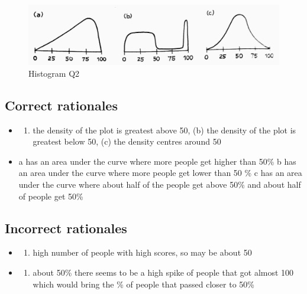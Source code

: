 \documentclass[letterpaper,10pt,twoside,printwatermark=false]{pinp}
\providecommand{\tightlist}{%
  \setlength{\itemsep}{0pt}\setlength{\parskip}{0pt}}
\begin{document}
\begin{figure}[H]
  \begin{center}
    \includegraphics[scale=0.19]{hist_q2.jpg} 
  \end{center}
  \caption{Histogram Q2}\label{fig}
\end{figure}

\subsection{Correct rationales}\label{correct-rationales-3}

\begin{itemize}
\item
  \begin{enumerate}
  \def\labelenumi{(\alph{enumi})}
  \tightlist
  \item
    the density of the plot is greatest above 50, (b) the density of the
    plot is greatest below 50, (c) the density centres around 50
  \end{enumerate}
\item
  a has an area under the curve where more people get higher than 50\% b
  has an area under the curve where more people get lower than 50 \% c
  has an area under the curve where about half of the people get above
  50\% and about half of people get 50\%
\end{itemize}

\subsection{Incorrect rationales}\label{incorrect-rationales-3}

\begin{itemize}
\item
  \begin{enumerate}
  \def\labelenumi{(\alph{enumi})}
  \setcounter{enumi}{1}
  \tightlist
  \item
    high number of people with high scores, so may be about 50
  \end{enumerate}
\item
  \begin{enumerate}
  \def\labelenumi{(\alph{enumi})}
  \setcounter{enumi}{1}
  \tightlist
  \item
    about 50\% there seems to be a high spike of people that got almost
    100 which would bring the \% of people that passed closer to 50\%
  \end{enumerate}
\end{itemize}
\end{document}
